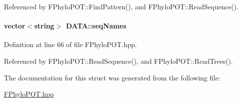 \-Referenced by \-F\-Phylo\-P\-O\-T\-::\-Find\-Pattern(), and \-F\-Phylo\-P\-O\-T\-::\-Read\-Sequence().

\hypertarget{structDATA_af4cdaf38ce8f08aecdff70e4301bca38}{
\paragraph[{seq\-Names}]{\setlength{\rightskip}{0pt plus 5cm}vector$<$string$>$ {\bf \-D\-A\-T\-A\-::seq\-Names}}}\label{structDATA_af4cdaf38ce8f08aecdff70e4301bca38}


\-Definition at line 66 of file \-F\-Phylo\-P\-O\-T.\-hpp.



\-Referenced by \-F\-Phylo\-P\-O\-T\-::\-Read\-Sequence(), and \-F\-Phylo\-P\-O\-T\-::\-Read\-Trees().



\-The documentation for this struct was generated from the following file\-:\begin{DoxyCompactItemize}
\item 
\hyperlink{FPhyloPOT_8hpp}{\-F\-Phylo\-P\-O\-T.\-hpp}\end{DoxyCompactItemize}
